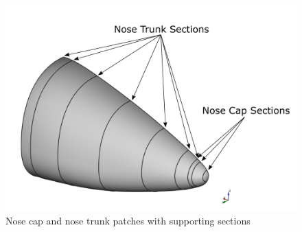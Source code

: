 \bigskip
%
\begin{figure}[H]
\centering
\includegraphics[scale=0.45]{Immagini/Capitolo3/nose_1}
\caption{Nose cap and nose trunk patches with supporting sections}
\label{fig:NoseCapPlusNoseTrunk}
\end{figure}
%

